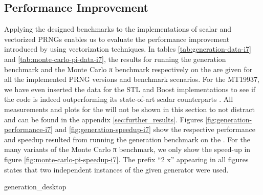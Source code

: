 \documentclass{stdlocal}
\begin{document}
  \subsection{Performance Improvement} %
  \label{sub:performance_improvement}
    Applying the designed benchmarks to the implementations of scalar and vectorized PRNGs enables us to evaluate the performance improvement introduced by using vectorization techniques.
    In tables \ref{tab:generation-data-i7} and \ref{tab:monte-carlo-pi-data-i7}, the results for running the generation benchmark and the Monte Carlo π benchmark respectively on the  are given for all the implemented PRNG versions and benchmark scenarios.
    For the MT19937, we have even inserted the data for the STL and Boost implementations to see if the code is indeed outperforming its state-of-art scalar counterparts \autocite{boost,gcc-libstdcpp}.
    All measurements and plots for the  will not be shown in this section to not distract and can be found in the appendix \ref{sec:further_results}.
    Figures \ref{fig:generation-performance-i7} and \ref{fig:generation-speedup-i7} show the respective performance and speedup resulted from running the generation benchmark on the .
    For the many variants of the Monte Carlo π benchmark, we only show the speed-up in figure \ref{fig:monte-carlo-pi-speedup-i7}.
    The prefix \enquote{2 x} appearing in all figures states that two independent instances of the given generator were used.

    \begin{table}[H]
      \center
      \caption[Generation Benchmark Data for ]{%
        Results achieved by running the generation benchmark on the  at a frequency of $4.51\appendUnit{GHz}$ with all implemented variants of given PRNGs.
        While running the benchmark, $16\appendUnit{GiB}$ of random numbers were generated and temporarily stored in a cache of size $16384\appendUnit{B}$ by iterating $2^{20}$ times over its content.
        During the execution, there were no cache or branch misses.
        The values for cycles, instructions, and IPCs were averaged over the calls to the advancing routine of the respective generator.
      }
      \label{tab:generation-data-i7}
      \footnotesize
      \renewcommand{\arraystretch}{1.2}
      {generation_desktop}
    \end{table}
\end{document}
